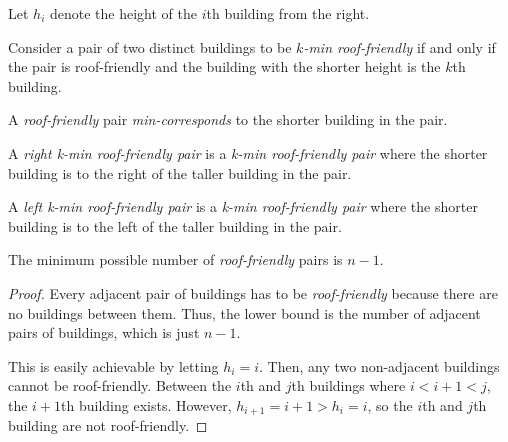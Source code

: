 \documentclass[10pt]{../usamts}
\begin{document}
\begin{solution}{3}

\begin{definition}
    Let $h_i$ denote the height of the $i$th building from the right.
\end{definition}

\begin{definition}
    Consider a pair of two distinct buildings to be \textit{$k$-min roof-friendly} if and only if the pair is roof-friendly and the building with the shorter height is the $k$th building. 
\end{definition}

\begin{definition}
    A \textit{roof-friendly} pair \textit{min-corresponds} to the shorter building in the pair.
\end{definition}

\begin{definition}
A \textit{right k-min roof-friendly pair} is a \textit{k-min roof-friendly pair} where the shorter building is to the right of the taller building in the pair.
\end{definition}

\begin{definition}
A \textit{left k-min roof-friendly pair} is a \textit{k-min roof-friendly pair} where the shorter building is to the left of the taller building in the pair.
\end{definition}

\begin{claim}
    The minimum possible number of \textit{roof-friendly} pairs is $\boxed{n-1}$.
\end{claim}

\begin{proof}
    Every adjacent pair of buildings has to be \textit{roof-friendly} because there are no buildings between them. Thus, the lower bound is the number of adjacent pairs of buildings, which is just $n-1$.
    
    This is easily achievable by letting $h_i = i$. Then, any two non-adjacent buildings cannot be roof-friendly. Between the $i$th and $j$th buildings where $i < i+1 < j$, the $i+1$th building exists. However, $h_{i+1} = i+1 > h_i = i$, so the $i$th and $j$th building are not roof-friendly.
\end{proof}


\end{solution}
\end{document}
